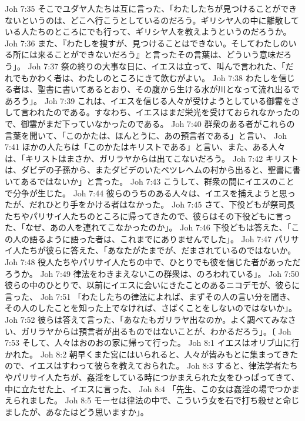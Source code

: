 Joh 7:35  そこでユダヤ人たちは互に言った、「わたしたちが見つけることができないというのは、どこへ行こうとしているのだろう。ギリシヤ人の中に離散している人たちのところにでも行って、ギリシヤ人を教えようというのだろうか。
Joh 7:36  また、『わたしを捜すが、見つけることはできない。そしてわたしのいる所には来ることができないだろう』と言ったその言葉は、どういう意味だろう」。
Joh 7:37  祭の終りの大事な日に、イエスは立って、叫んで言われた、「だれでもかわく者は、わたしのところにきて飲むがよい。
Joh 7:38  わたしを信じる者は、聖書に書いてあるとおり、その腹から生ける水が川となって流れ出るであろう」。
Joh 7:39  これは、イエスを信じる人々が受けようとしている御霊をさして言われたのである。すなわち、イエスはまだ栄光を受けておられなかったので、御霊がまだ下っていなかったのである。
Joh 7:40  群衆のある者がこれらの言葉を聞いて、「このかたは、ほんとうに、あの預言者である」と言い、
Joh 7:41  ほかの人たちは「このかたはキリストである」と言い、また、ある人々は、「キリストはまさか、ガリラヤからは出てこないだろう。
Joh 7:42  キリストは、ダビデの子孫から、またダビデのいたベツレヘムの村から出ると、聖書に書いてあるではないか」と言った。
Joh 7:43  こうして、群衆の間にイエスのことで分争が生じた。
Joh 7:44  彼らのうちのある人々は、イエスを捕えようと思ったが、だれひとり手をかける者はなかった。
Joh 7:45  さて、下役どもが祭司長たちやパリサイ人たちのところに帰ってきたので、彼らはその下役どもに言った、「なぜ、あの人を連れてこなかったのか」。
Joh 7:46  下役どもは答えた、「この人の語るように語った者は、これまでにありませんでした」。
Joh 7:47  パリサイ人たちが彼らに答えた、「あなたがたまでが、だまされているのではないか。
Joh 7:48  役人たちやパリサイ人たちの中で、ひとりでも彼を信じた者があっただろうか。
Joh 7:49  律法をわきまえないこの群衆は、のろわれている」。
Joh 7:50  彼らの中のひとりで、以前にイエスに会いにきたことのあるニコデモが、彼らに言った、
Joh 7:51  「わたしたちの律法によれば、まずその人の言い分を聞き、その人のしたことを知った上でなければ、さばくことをしないのではないか」。
Joh 7:52  彼らは答えて言った、「あなたもガリラヤ出なのか。よく調べてみなさい、ガリラヤからは預言者が出るものではないことが、わかるだろう」。〔
Joh 7:53  そして、人々はおのおの家に帰って行った。
Joh 8:1  イエスはオリブ山に行かれた。
Joh 8:2  朝早くまた宮にはいられると、人々が皆みもとに集まってきたので、イエスはすわって彼らを教えておられた。
Joh 8:3  すると、律法学者たちやパリサイ人たちが、姦淫をしている時につかまえられた女をひっぱってきて、中に立たせた上、イエスに言った、
Joh 8:4  「先生、この女は姦淫の場でつかまえられました。
Joh 8:5  モーセは律法の中で、こういう女を石で打ち殺せと命じましたが、あなたはどう思いますか」。
